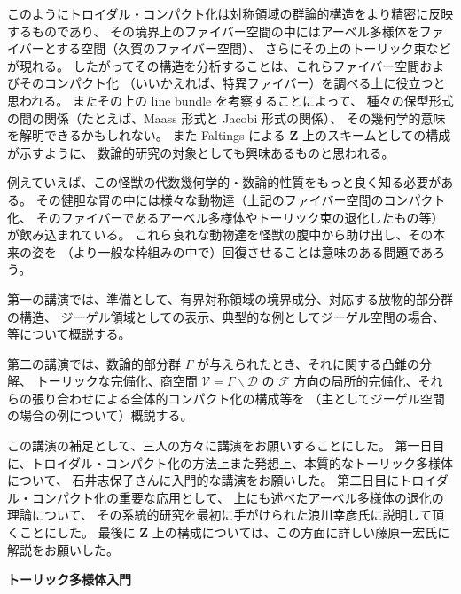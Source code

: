 \documentclass[uplatex,dvipdfmx]{jlreq}
\begin{document}
\medskip

このようにトロイダル・コンパクト化は対称領域の群論的構造をより精密に反映するものであり、
その境界上のファイバー空間の中にはアーベル多様体をファイバーとする空間（久賀のファイバー空間）、
さらにその上のトーリック束などが現れる。
したがってその構造を分析することは、これらファイバー空間およびそのコンパクト化
（いいかえれば、特異ファイバー）を調べる上に役立つと思われる。
またその上の line bundle を考察することによって、
種々の保型形式の間の関係（たとえば、Maass 形式と Jacobi 形式の関係）、
その幾何学的意味を解明できるかもしれない。
また Faltings による $\mathbf{Z}$ 上のスキームとしての構成が示すように、
数論的研究の対象としても興味あるものと思われる。

\medskip

例えていえば、この怪獣の代数幾何学的・数論的性質をもっと良く知る必要がある。
その健胆な胃の中には様々な動物達（上記のファイバー空間のコンパクト化、
そのファイバーであるアーベル多様体やトーリック束の退化したもの等）が飲み込まれている。
これら哀れな動物達を怪獣の腹中から助け出し、その本来の姿を
（より一般な枠組みの中で）回復させることは意味のある問題であろう。

\bigskip

第一の講演では、準備として、有界対称領域の境界成分、対応する放物的部分群の構造、
ジーゲル領域としての表示、典型的な例としてジーゲル空間の場合、等について概説する。

第二の講演では、数論的部分群 $\Gamma$ が与えられたとき、それに関する凸錐の分解、
トーリックな完備化、商空間 $\mathcal{V} = \Gamma \backslash \mathcal{D}$ の
$\mathcal{F}$ 方向の局所的完備化、それらの張り合わせによる全体的コンパクト化の構成等を
（主としてジーゲル空間の場合の例について）概説する。

\bigskip

この講演の補足として、三人の方々に講演をお願いすることにした。
第一日目に、トロイダル・コンパクト化の方法上また発想上、本質的なトーリック多様体について、
石井志保子さんに入門的な講演をお願いした。
第二日目にトロイダル・コンパクト化の重要な応用として、
上にも述べたアーベル多様体の退化の理論について、
その系統的研究を最初に手がけられた浪川幸彦氏に説明して頂くことにした。
最後に $\mathbf{Z}$ 上の構成については、この方面に詳しい藤原一宏氏に解説をお願いした。

\newpage

\noindent
{\large\bfseries トーリック多様体入門}
\end{document}
